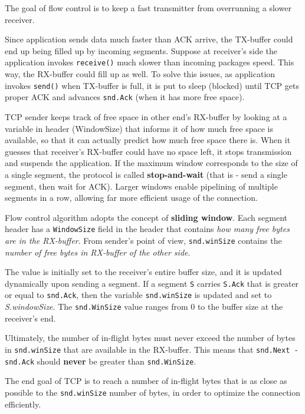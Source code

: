 \documentclass[10pt]{\classname}
\begin{document}
The goal of flow control is to keep a fast transmitter from overrunning a
slower receiver.

Since application sends data much faster than ACK arrive, the TX-buffer could
end up being filled up by incoming segments. Suppose at receiver's side the
application invokes \texttt{receive()} much slower than incoming packages
speed. This way, the RX-buffer could fill up as well. To solve this issues, as
application invokes \texttt{send()} when TX-buffer is full, it is
put to sleep (blocked) until TCP gets proper ACK and advances \texttt{snd.Ack}
(when it has more free space).

TCP sender keeps track of free space in other end's RX-buffer by looking at a
variable in header (WindowSize) that informs it of how much free space is
available, so that it can actually predict how much free space there is. When
it guesses that receiver's RX-buffer could have no space left, it stops
transmission and suspends the application. If the maximum window corresponds to
the size of a single segment, the protocol is called \textbf{stop-and-wait}
(that is \-- send a single segment, then wait for ACK). Larger windows enable
pipelining of multiple segments in a row, allowing far more efficient usage of
the connection.

Flow control algorithm adopts the concept of \textbf{sliding window}. Each
segment header has a \texttt{WindowSize} field in the header that contains
\emph{how many free bytes are in the RX-buffer}. From sender's point of view,
\texttt{snd.winSize} contains the \emph{number of free bytes in RX-buffer of
the other side}.

The value is initially set to the receiver's entire buffer size, and it is
updated dynamically upon sending a segment. If a segment \texttt{S} carries
\texttt{S.Ack} that is greater or equal to \texttt{snd.Ack}, then the variable
\texttt{snd.winSize} is updated and set to \emph{S.windowSize}. The
\texttt{snd.WinSize} value ranges from $0$ to the buffer size at the receiver's
end.

Ultimately, the number of in-flight bytes must never exceed the number of bytes
in \texttt{snd.winSize} that are available in the RX-buffer. This means that
\texttt{snd.Next - snd.Ack} should \textbf{never} be greater than
\texttt{snd.\-WinSize}.

The end goal of TCP is to reach a number of in-flight bytes that is as close as
possible to the \texttt{snd.winSize} number of bytes, in order to optimize the
connection efficiently.
\end{document}
